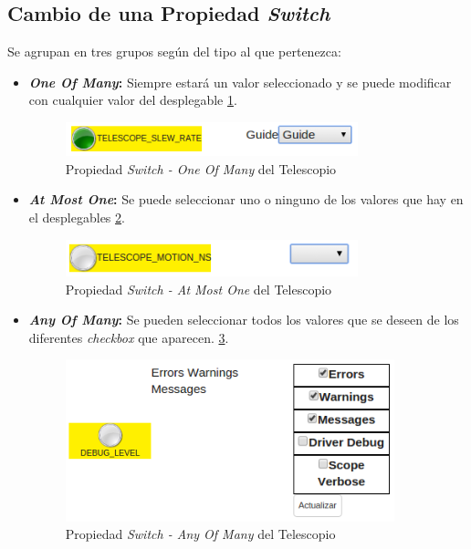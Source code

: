 \subsection{Cambio de una Propiedad \textit{Switch}}
Se agrupan en tres grupos según del tipo al que pertenezca:
\begin{itemize}
  \item \textbf{\textit{One Of Many}:} Siempre estará un valor seleccionado y se puede modificar con cualquier valor del desplegable \ref{fig:oneOfMany}.
  \begin{figure}[htb]
  \centering
  \includegraphics[width=0.8\textwidth]{./imagenes/oneOfMany}
  \caption{Propiedad \textit{Switch - One Of Many} del Telescopio} \label{fig:oneOfMany}
  \end{figure}
  \item \textbf{\textit{At Most One}:} Se puede seleccionar uno o ninguno de los valores que hay en el desplegables \ref{fig:atMostOne}.
  \begin{figure}[htb]
  \centering
  \includegraphics[width=0.8\textwidth]{./imagenes/atMostOne}
  \caption{Propiedad \textit{Switch - At Most One} del Telescopio} \label{fig:atMostOne}
  \end{figure}
  \item \textbf{\textit{Any Of Many}:} Se pueden seleccionar todos los valores que se deseen de los diferentes \textit{checkbox} que aparecen.
 \ref{fig:anyOfMany}.
  \begin{figure}[htb]
  \centering
  \includegraphics[width=0.9\textwidth]{./imagenes/anyOfMany}
  \caption{Propiedad \textit{Switch - Any Of Many} del Telescopio} \label{fig:anyOfMany}
  \end{figure}
\end{itemize}

